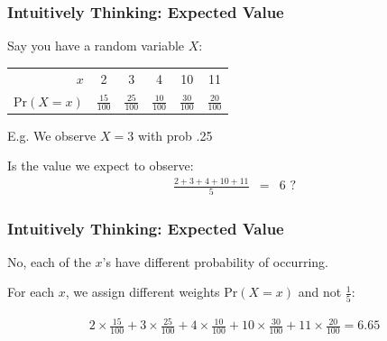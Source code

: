 \documentclass[handout]{beamer}
\newcommand{\blue}[1]{\textcolor{blue2}{#1}}
\newcommand{\prob}{\mbox{Pr}}
\begin{document}
%
%
%
\begin{frame}
\frametitle{Intuitively Thinking: Expected Value}
Say you have a random variable $X$:
\begin{center}
\begin{tabular}{r|ccccc}
  \hline
$x$ & 2 & 3 & 4 & 10 & 11 \\ 
  $\prob(X=x)$ & $\frac{15}{100}$ & $\frac{25}{100}$ & $\frac{10}{100}$ & $\frac{30}{100}$ & $\frac{20}{100}$\\ 
   \hline
\end{tabular}
\end{center}

\vspace{0.5cm}

E.g. We observe $X=3$ with prob .25

\pause
\vspace{0.5cm}

\pause Is the value we expect to observe: 
\begin{eqnarray*}
\frac{2 + 3 + 4 + 10 + 11}{5} &=& 6 \mbox{ ?}
\end{eqnarray*}

\end{frame}


\begin{frame}
\frametitle{Intuitively Thinking: Expected Value}
No, each of the $x$'s have different \blue{probability} of occurring.

\vspace{0.25cm}

\pause
For each $x$, we assign different \blue{weights} $\prob(X=x)$ and not $\frac{1}{5}$:

\begin{eqnarray*}
2 \times \frac{15}{100} + 3 \times \frac{25}{100} + 4 \times \frac{10}{100} + 10 \times \frac{30}{100} + 11 \times \frac{20}{100} = 6.65
\end{eqnarray*}

\end{frame}
\end{document}
